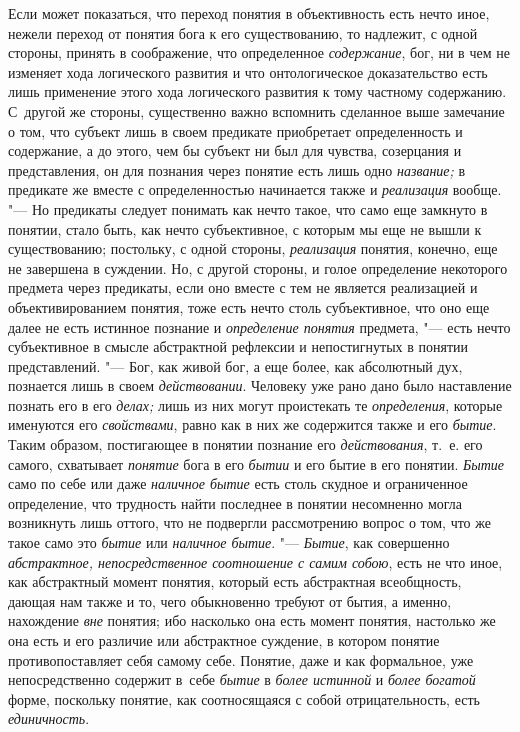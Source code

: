 Если может показаться, что переход понятия в объективность
есть нечто иное, нежели переход от понятия бога к его существованию, то
надлежит, с одной стороны, принять в соображение, что определенное
{\em содержание}, бог, ни
в чем не изменяет хода логического развития и что онтологическое
доказательство есть лишь применение этого хода логического развития к тому
частному содержанию. С~другой же стороны, существенно важно вспомнить
сделанное выше замечание о том, что субъект лишь в своем предикате
приобретает определенность и содержание, а до этого, чем бы субъект ни был
для чувства, созерцания и представления, он для познания через понятие есть
лишь одно {\em название;} в предикате же вместе с определенностью начинается
также и {\em реализация} вообще.
"--- Но предикаты следует понимать как нечто такое, что само еще
замкнуто в понятии, стало быть, как нечто субъективное, с которым мы еще не
вышли к существованию; постольку, с одной стороны, {\em реализация} понятия,
конечно, еще не завершена в суждении. Но, с другой стороны, и голое
определение некоторого предмета через предикаты, если оно вместе с тем не
является реализацией и объективированием понятия, тоже есть нечто столь
субъективное, что оно еще далее не есть истинное познание и
{\em определение понятия} предмета, "--- есть нечто субъективное в смысле
абстрактной рефлексии и непостигнутых в понятии представлений. "---
Бог, как живой бог, а еще более, как абсолютный дух,
познается лишь в своем {\em действовании}.
Человеку уже рано дано было наставление познать его в его
{\em делах;} лишь из них могут проистекать те {\em определения},
которые именуются его {\em свойствами}, равно
как в них же содержится также и его {\em бытие}. Таким
образом, постигающее в понятии познание его {\em действования}, т.~е.
его самого, схватывает {\em понятие} бога в его {\em бытии}
и его бытие в его понятии. {\em Бытие} само по себе
или даже {\em наличное бытие}
есть столь скудное и ограниченное определение, что трудность
найти последнее в понятии несомненно могла возникнуть лишь оттого, что не
подвергли рассмотрению вопрос о том, что же такое само это
{\em бытие} или {\em наличное бытие}. "--- {\em Бытие}, как
совершенно {\em абстрактное,
непосредственное соотношение с самим собою}, есть не что
иное, как абстрактный момент понятия, который есть
абстрактная всеобщность, дающая нам также и то, чего обыкновенно требуют от
бытия, а именно, нахождение {\em вне}
понятия; ибо насколько она есть момент понятия, настолько же
она есть и его различие или абстрактное суждение, в котором понятие
противопоставляет себя самому себе. Понятие, даже и как формальное, уже
непосредственно содержит в~себе
{\em бытие} в {\em более истинной} и {\em более богатой}
форме, поскольку понятие, как соотносящаяся с собой
отрицательность, есть {\em единичность}.

